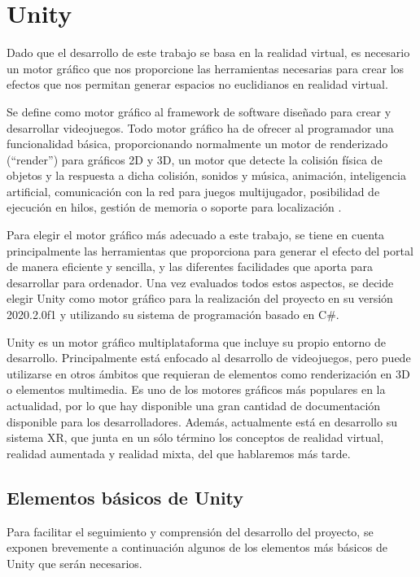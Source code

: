\documentclass[../main.tex]{subfiles}
\begin{document}
\section{Unity}
Dado que el desarrollo de este trabajo se basa en la realidad virtual, es necesario un motor gráfico que nos proporcione las herramientas necesarias para crear los efectos que nos permitan generar espacios no euclidianos en realidad virtual.

Se define como motor gráfico al framework de software diseñado para crear y desarrollar videojuegos. Todo motor gráfico ha de ofrecer al programador una funcionalidad básica, proporcionando normalmente un motor de renderizado (“render”) para gráficos 2D y 3D, un motor que detecte la colisión física de objetos y la respuesta a dicha colisión, sonidos y música, animación, inteligencia artificial, comunicación con la red para juegos multijugador, posibilidad de ejecución en hilos, gestión de memoria o soporte para localización \cite{Graphic_Engines}.

Para elegir el motor gráfico más adecuado a este trabajo, se tiene en cuenta principalmente las herramientas que proporciona para generar el efecto del portal de manera eficiente y sencilla, y las diferentes facilidades que aporta para desarrollar para ordenador. Una vez evaluados todos estos aspectos, se decide elegir Unity como motor gráfico para la realización del proyecto en su versión 2020.2.0f1 y utilizando su sistema de programación basado en C\#. 

Unity es un motor gráfico multiplataforma que incluye su propio entorno de desarrollo. Principalmente está enfocado al desarrollo de videojuegos, pero puede utilizarse en otros ámbitos que requieran de elementos como renderización en 3D o elementos multimedia. Es uno de los motores gráficos más populares en la actualidad, por lo que hay disponible una gran cantidad de documentación disponible para los desarrolladores. Además, actualmente está en desarrollo su sistema XR, que junta en un sólo término los conceptos de realidad virtual, realidad aumentada y realidad mixta, del que hablaremos más tarde.

\subsection{Elementos básicos de Unity}

Para facilitar el seguimiento y comprensión del desarrollo del proyecto, se exponen brevemente a continuación algunos de los elementos más básicos de Unity que serán necesarios.
\end{document}
